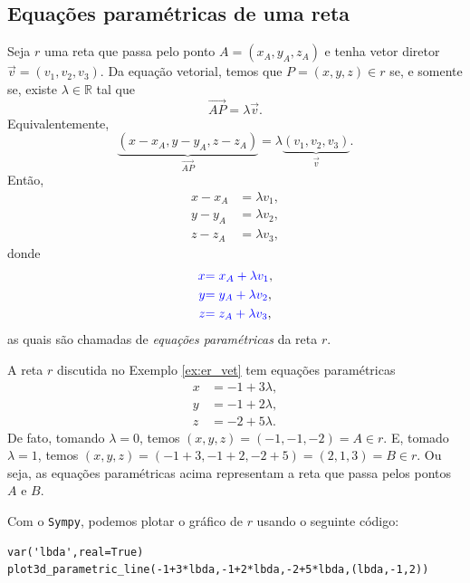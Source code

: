 \subsection{Equações paramétricas de uma reta}

Seja $r$ uma reta que passa pelo ponto $A = (x_A,y_A,z_A)$ e tenha vetor diretor $\vec{v} = (v_1,v_2,v_3)$. Da equação vetorial, temos que $P = (x,y,z)\in r$ se, e somente se, existe $\lambda\in\mathbb{R}$ tal que
\begin{equation}
  \overrightarrow{AP} = \lambda\vec{v}.
\end{equation}
Equivalentemente,
\begin{equation}
  \underbrace{(x-x_A,y-y_A,z-z_A)}_{\overrightarrow{AP}} = \lambda \underbrace{(v_1,v_2,v_3)}_{\vec{v}}.
\end{equation}
Então,
\begin{align}
  x-x_A &= \lambda v_1,\\
  y-y_A &= \lambda v_2,\\
  z-z_A &= \lambda v_3,
\end{align}
donde
\begin{align}
  {\color{blue}x} &{\color{blue}= x_A + \lambda v_1},\\
  {\color{blue}y} &{\color{blue}= y_A + \lambda v_2},\\
  {\color{blue}z} &{\color{blue}= z_A + \lambda v_3},
\end{align}
as quais são chamadas de \emph{equações paramétricas} da reta $r$.

\begin{ex}\label{ex:ex_er_par}
  A reta $r$ discutida no Exemplo \ref{ex:er_vet} tem equações paramétricas
  \begin{align}
    x &= -1 + 3\lambda,\\
    y &= -1 + 2\lambda,\\
    z &= -2 + 5\lambda.
  \end{align}
  De fato, tomando $\lambda = 0$, temos $(x,y,z) = (-1,-1,-2) = A\in r$. E, tomado $\lambda = 1$, temos $(x,y,z) = (-1+3,-1+2,-2+5) = (2,1,3) = B\in r$. Ou seja, as equações paramétricas acima representam a reta que passa pelos pontos $A$ e $B$.

  \ifispython
  Com o \verb+Sympy+, podemos plotar o gráfico de $r$ usando o seguinte código:
\begin{verbatim}
var('lbda',real=True)
plot3d_parametric_line(-1+3*lbda,-1+2*lbda,-2+5*lbda,(lbda,-1,2))
\end{verbatim}
  \fi
\end{ex}

